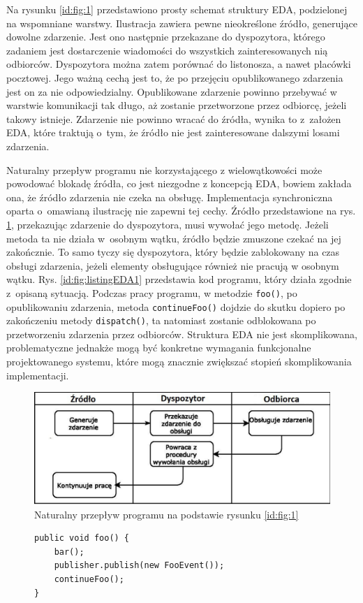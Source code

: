 \documentclass[a4paper]{book}
\begin{document}
{Na rysunku \ref{id:fig:1} przedstawiono prosty schemat struktury EDA, podzielonej na wspomniane warstwy. Ilustracja zawiera pewne nieokreślone źródło, generujące dowolne zdarzenie. Jest ono następnie przekazane do dyspozytora, którego zadaniem jest dostarczenie wiadomości do wszystkich zainteresowanych nią odbiorców. Dyspozytora można zatem porównać do listonosza, a nawet placówki pocztowej. Jego ważną cechą jest to, że po przejęciu opublikowanego zdarzenia jest on za nie odpowiedzialny. Opublikowane zdarzenie powinno przebywać w warstwie komunikacji tak długo, aż zostanie przetworzone przez odbiorcę, jeżeli takowy istnieje. Zdarzenie nie powinno wracać do źródła, wynika to z~założen EDA, które traktują o~tym, że źródło nie jest zainteresowane dalszymi losami zdarzenia.


Naturalny przepływ programu nie korzystającego z wielowątkowości może powodować blokadę źródła, co jest niezgodne z koncepcją EDA, bowiem zakłada ona, że źródło zdarzenia nie czeka na obsługę. Implementacja synchroniczna oparta o~omawianą ilustrację nie zapewni tej cechy. Źródło przedstawione na rys. \ref{id:fig:2}, przekazując zdarzenie do dyspozytora, musi wywołać jego metodę. Jeżeli metoda ta nie działa w~osobnym wątku, źródło będzie zmuszone czekać na jej zakończnie. To samo tyczy się dyspozytora, który będzie zablokowany na czas obsługi zdarzenia, jeżeli elementy obsługujące również nie pracują w osobnym wątku. Rys. \ref{id:fig:listingEDA1} przedstawia kod programu, który działa zgodnie z~opisaną sytuacją. Podczas pracy programu, w metodzie \lstinline|foo()|, po opublikowaniu zdarzenia, metoda \lstinline|continueFoo()| dojdzie do skutku dopiero po zakończeniu metody \lstinline|dispatch()|, ta natomiast zostanie odblokowana po przetworzeniu zdarzenia przez odbiorców. Struktura EDA nie jest skomplikowana, problematyczne jednakże mogą być konkretne wymagania funkcjonalne projektowanego systemu, które mogą znacznie zwiększać stopień skomplikowania implementacji.
\begin{figure}
	\centering
	\includegraphics[width=1.0\textwidth]{./img/EDA_FlowSynchro.pdf}
	\caption{Naturalny przepływ programu na podstawie rysunku \ref{id:fig:1}}
	\label{id:fig:2}
\end{figure}
\begin{figure} 
\begin{lstlisting}
public void foo() {
	bar();
	publisher.publish(new FooEvent());
	continueFoo();
}


\end{lstlisting}
\end{figure}}
\end{document}

